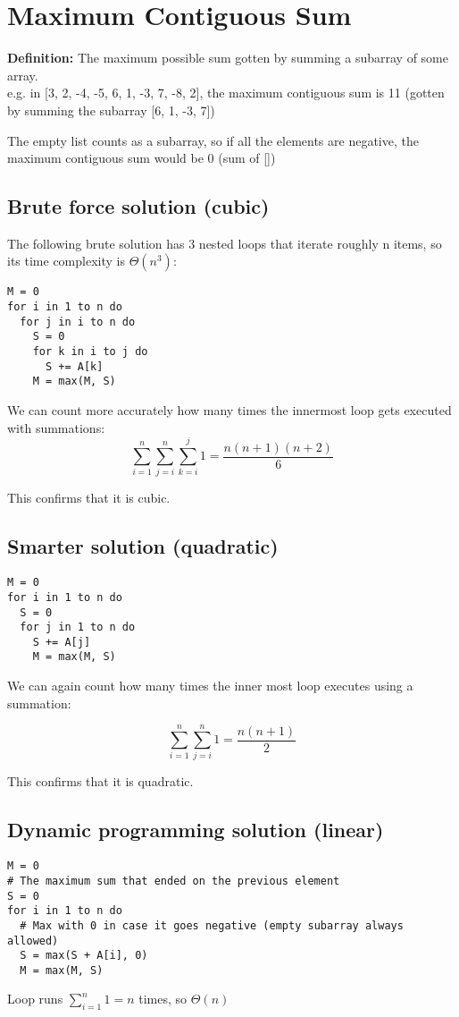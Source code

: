 \section{Maximum Contiguous Sum}

\textbf{Definition:} The maximum possible sum gotten by summing a subarray of some array.\\
e.g. in [3, 2, -4, -5, 6, 1, -3, 7, -8, 2], the maximum contiguous sum is 11 (gotten by summing the subarray [6, 1, -3, 7])

The empty list counts as a subarray, so if all the elements are negative, the maximum contiguous sum would be 0 (sum of [])

\subsection*{Brute force solution (cubic)}

The following brute solution has 3 nested loops that iterate roughly n items, so its time complexity is $\Theta(n^3)$:

\begin{verbatim}
M = 0
for i in 1 to n do
  for j in i to n do
    S = 0
    for k in i to j do
      S += A[k]
    M = max(M, S)
\end{verbatim}

We can count more accurately how many times the innermost loop gets executed with summations:
\[\sum_{i=1}^n \sum_{j=i}^n \sum_{k=i}^j 1 = \frac{n(n+1)(n+2)}{6}\]

This confirms that it is cubic.

\subsection*{Smarter solution (quadratic)}

\begin{verbatim}
M = 0
for i in 1 to n do
  S = 0
  for j in 1 to n do
    S += A[j]
    M = max(M, S)
\end{verbatim}

We can again count how many times the inner most loop executes using a summation:

\[\sum_{i=1}^n \sum_{j=i}^n 1 = \frac{n(n+1)}{2}\]

This confirms that it is quadratic.

\subsection*{Dynamic programming solution (linear)}

\begin{verbatim}
M = 0
# The maximum sum that ended on the previous element
S = 0
for i in 1 to n do
  # Max with 0 in case it goes negative (empty subarray always allowed)
  S = max(S + A[i], 0)
  M = max(M, S)
\end{verbatim}

Loop runs $\displaystyle \sum_{i=1}^n 1 = n$ times, so $\Theta(n)$
